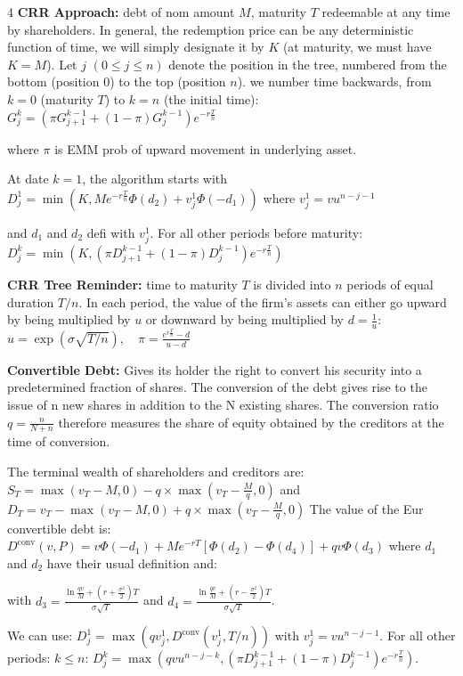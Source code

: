 \documentclass[landscape]{article}
\begin{document}
\begin{multicols}{4}
\textbf{CRR Approach:} debt of nom amount $M$, maturity $T$ redeemable at any time by shareholders. In general, the redemption price can be any deterministic function of time, we will simply designate it by $K$ (at maturity, we must have $K = M$).
Let $j$ $(0 \leq j \leq n)$ denote the position in the tree, numbered from the bottom (position 0) to the top (position $n$). we number time backwards, from $k = 0$ (maturity $T$) to $k = n$ (the initial time): $G_j^k = (\pi G_{j+1}^{k-1} + (1 - \pi)G_j^{k-1})e^{-r\frac{T}{n}}$

where $\pi$ is EMM prob of upward movement in underlying asset.

At date $k = 1$, the algorithm starts with $D_j^1 = \min\left(K, Me^{-r\frac{T}{n}}\Phi(d_2) + v_j^1\Phi(-d_1)\right)$ where $v_j^1 = vu^{n-j-1}$

and $d_1$ and $d_2$ defi with $v_j^1$. For all other periods before maturity: $D_j^k = \min\left(K, (\pi D_{j+1}^{k-1} + (1-\pi)D_j^{k-1})e^{-r\frac{T}{n}}\right)$

\textbf{CRR Tree Reminder:} time to maturity $T$ is divided into $n$ periods of equal duration $T/n$. In each period, the value of the firm's assets can either go upward by being multiplied by $u$ or downward by being multiplied by $d = \frac{1}{u}$: $u = \exp(\sigma\sqrt{T/n}), \quad \pi = \frac{e^{r\frac{T}{n}} - d}{u - d}$

\textcolor{subsubsectioncolor}{\textbf{Convertible Debt:}} Gives its holder the right to convert his security into a predetermined fraction of shares.
 The conversion of the debt gives 
rise to the issue of n new shares in addition to the N existing shares. The conversion ratio $q=\frac{n}{N+n}$ therefore measures the share of equity obtained by the creditors at the time of 
conversion. 

The terminal wealth of shareholders and creditors are: $S_T = \max(v_T - M, 0) - q \times \max\left(v_T - \frac{M}{q}, 0\right)$ and $D_T = v_T - \max(v_T - M, 0) + q \times \max\left(v_T - \frac{M}{q}, 0\right)$
The value of the Eur convertible debt is: $D^{\text{conv}}(v,P) = v\Phi(-d_1) + Me^{-rT}[\Phi(d_2) - \Phi(d_4)] + qv\Phi(d_3)$
where $d_1$ and $d_2$ have their usual definition and:

with $d_3 = \frac{\ln \frac{qv}{M} + (r + \frac{\sigma^2}{2})T}{\sigma\sqrt{T}}$ and $d_4 = \frac{\ln \frac{qv}{M} + (r - \frac{\sigma^2}{2})T}{\sigma\sqrt{T}}$.

We can use: $D_j^1 = \max\left(qv_j^1, D^{\text{conv}}(v_j^1, T/n)\right)$ with $v_j^1 = vu^{n-j-1}$. 
For all other periods: $k \leq n$: $D_j^k = \max\left(qvu^{n-j-k}, (\pi D_{j+1}^{k-1} + (1-\pi)D_j^{k-1})e^{-r\frac{T}{n}}\right)$.


\end{multicols}
\end{document}
